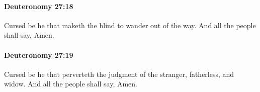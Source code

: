 		\paragraph{Deuteronomy 27:18} %
			\label{DEUTERONOMY-27-18}

			Cursed be he that maketh the blind to wander out of the way. And all the people shall say, Amen.


		\paragraph{Deuteronomy 27:19} %
			\label{DEUTERONOMY-27-19}

			Cursed be he that perverteth the judgment of the stranger, fatherless, and widow. And all the people shall say, Amen.


